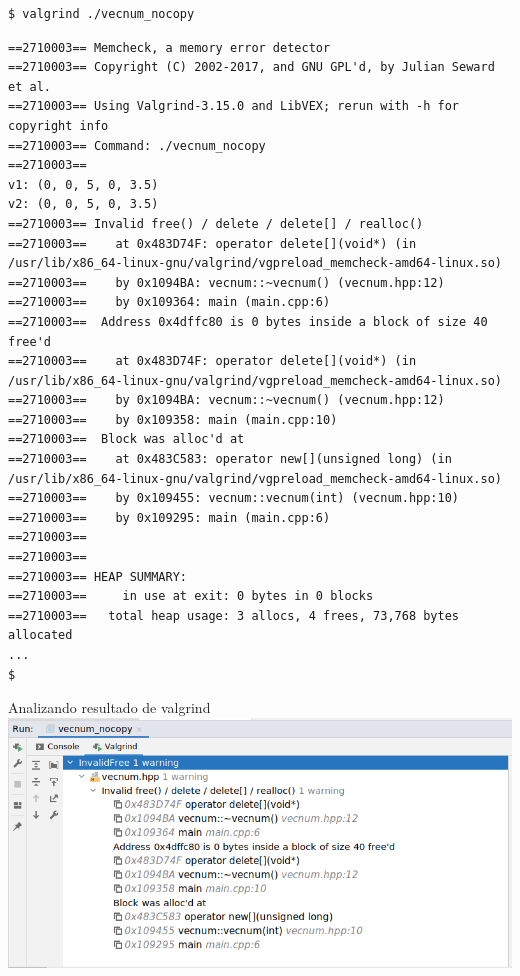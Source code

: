 \begin{frame}[fragile]
\begin{lstlisting}[style=terminal,basicstyle=\tiny\ttfamily]
$ valgrind ./vecnum_nocopy 
\end{lstlisting}
\begin{lstlisting}[style=terminal,basicstyle=\tiny\ttfamily]
==2710003== Memcheck, a memory error detector
==2710003== Copyright (C) 2002-2017, and GNU GPL'd, by Julian Seward et al.
==2710003== Using Valgrind-3.15.0 and LibVEX; rerun with -h for copyright info
==2710003== Command: ./vecnum_nocopy
==2710003== 
v1: (0, 0, 5, 0, 3.5)
v2: (0, 0, 5, 0, 3.5)
==2710003== Invalid free() / delete / delete[] / realloc()
==2710003==    at 0x483D74F: operator delete[](void*) (in /usr/lib/x86_64-linux-gnu/valgrind/vgpreload_memcheck-amd64-linux.so)
==2710003==    by 0x1094BA: vecnum::~vecnum() (vecnum.hpp:12)
==2710003==    by 0x109364: main (main.cpp:6)
==2710003==  Address 0x4dffc80 is 0 bytes inside a block of size 40 free'd
==2710003==    at 0x483D74F: operator delete[](void*) (in /usr/lib/x86_64-linux-gnu/valgrind/vgpreload_memcheck-amd64-linux.so)
==2710003==    by 0x1094BA: vecnum::~vecnum() (vecnum.hpp:12)
==2710003==    by 0x109358: main (main.cpp:10)
==2710003==  Block was alloc'd at
==2710003==    at 0x483C583: operator new[](unsigned long) (in /usr/lib/x86_64-linux-gnu/valgrind/vgpreload_memcheck-amd64-linux.so)
==2710003==    by 0x109455: vecnum::vecnum(int) (vecnum.hpp:10)
==2710003==    by 0x109295: main (main.cpp:6)
==2710003== 
==2710003== 
==2710003== HEAP SUMMARY:
==2710003==     in use at exit: 0 bytes in 0 blocks
==2710003==   total heap usage: 3 allocs, 4 frees, 73,768 bytes allocated
...
$
\end{lstlisting}
\end{frame}

\begin{frame}[t,fragile]{Analizando resultado de valgrind}
\includegraphics[width=\textwidth]{images/02-copia/vecnum-nocopy-valgrind.png}
\end{frame}


